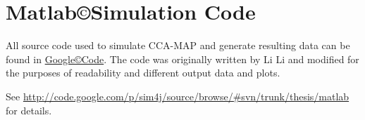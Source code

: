 \chapter{Matlab\copyright Simulation Code}
\label{AppendixA}

All source code used to simulate CCA-MAP and generate resulting data can be found in \href{http://code.google.com}{Google\copyright Code}.  The code was originally written by Li Li and modified for the purposes of readability and different output data and plots.

See \url{http://code.google.com/p/sim4j/source/browse/#svn/trunk/thesis/matlab} for details.

